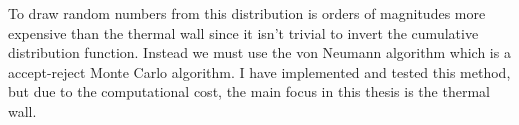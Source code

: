 To draw random numbers from this distribution is orders of magnitudes more expensive than the thermal wall since it isn't trivial to invert the cumulative distribution function. Instead we must use the von Neumann algorithm which is a accept-reject Monte Carlo algorithm\cite{allen1989computer}. I have implemented and tested this method, but due to the computational cost, the main focus in this thesis is the thermal wall. 